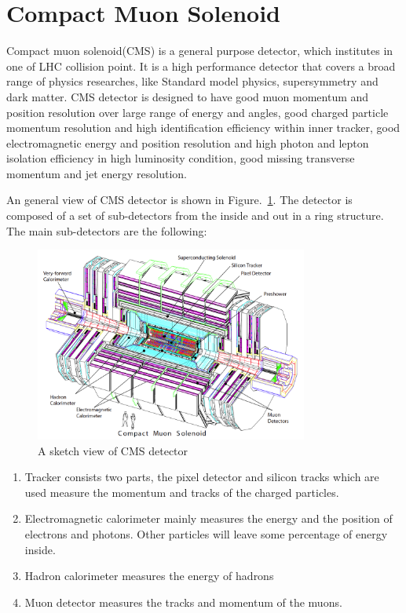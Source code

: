 \section{Compact Muon Solenoid}
Compact muon solenoid(CMS) is a general purpose detector, which institutes in one of LHC collision point. It is a high performance detector that covers a broad range of physics researches, like Standard model physics, supersymmetry and dark matter. CMS detector is designed to have good muon momentum and position resolution over large range of energy and angles, good charged particle momentum resolution and high identification efficiency within inner tracker, good electromagnetic energy and position resolution and high photon and lepton isolation efficiency in high luminosity condition, good missing transverse momentum and jet energy resolution.  


An general view of CMS detector is shown in Figure.~\ref{fig:CMS_sketch}. The detector is composed of a set of sub-detectors from the inside and out in a ring structure. The main sub-detectors are the following:

\begin{figure}[htbp] 
\centering
\includegraphics[width=0.8\textwidth]{chapter3/CMS_detecter.png}
\caption{A sketch view of CMS detector~\cite{CMS_experiment}}
\label{fig:CMS_sketch}
\end{figure}


\begin{enumerate}[$\bullet$]
\item Tracker consists two parts, the pixel detector and silicon tracks which are used measure the momentum and tracks of the charged particles.
\item Electromagnetic calorimeter mainly measures the energy and the position of electrons and photons. Other particles will leave some percentage of energy inside. 
\item Hadron calorimeter measures the energy of hadrons 
\item Muon detector measures the tracks and momentum of the muons.
\end{enumerate} 


